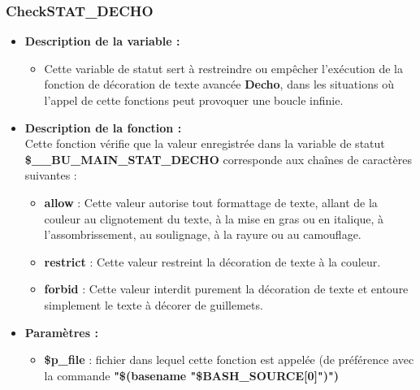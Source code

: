 \documentclass[a4paper,10pt]{article}
\begin{document}
\subsubsection{CheckSTAT\_DECHO}\color{white}
\begin{itemize}
    \item \textbf{Description de la variable :}
    \begin{itemize}
        \item Cette variable de statut sert à restreindre ou empêcher l'exécution de la fonction de décoration de texte avancée \textbf{\color{mauve}Decho}, dans les situations où l'appel de cette fonctions peut provoquer une boucle infinie.\\[1\baselineskip]
    \end{itemize}


    \item \textbf{Description de la fonction :}\\
        Cette fonction vérifie que la valeur enregistrée dans la variable de statut\\
        \textbf{\color{orange}\$\_\_BU\_MAIN\_STAT\_DECHO} corresponde aux chaînes de caractères suivantes :\\[1\baselineskip]
        \begin{itemize}
            \item \textbf{allow} : Cette valeur autorise tout formattage de texte, allant de la couleur au clignotement du texte, à la mise en gras ou en italique, à l'assombrissement, au soulignage, à la rayure ou au camouflage.\\[1\baselineskip]

            \item \textbf{restrict} : Cette valeur restreint la décoration de texte à la couleur.\\[1\baselineskip]

            \item \textbf{forbid} : Cette valeur interdit purement la décoration de texte et entoure simplement le texte à décorer de guillemets.\\[1\baselineskip]
        \end{itemize}

    \item \textbf{Paramètres :}
    \begin{itemize}
        \item \color{orange}\textbf{\$p\_file}\color{white} : fichier dans lequel cette fonction est appelée (de préférence avec la commande \textbf{"\$(\color{gray}basename \color{white}"\color{orange}\$BASH\_SOURCE[0]\color{white}")")}\\[1\baselineskip]


\end{itemize}
\end{itemize}
\end{document}
